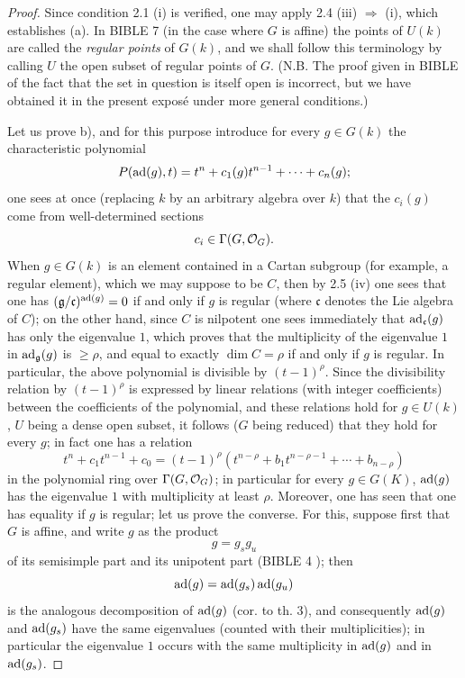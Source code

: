\begin{proof}
Since condition 2.1 (i) is verified, one may apply 2.4 (iii)
$\Rightarrow$ (i), which establishes (a). In BIBLE 7 (in the case where
$G$ is affine) the points of $U(k)$ are called the \emph{regular points}
of $G(k)$, and we shall follow this terminology by calling $U$ the open
subset of regular points of $G$. (N.B. The proof given in BIBLE of the
fact that the set in question is itself open is incorrect, but we have
obtained it in the present expos\'e under more general conditions.)

Let us prove b), and for this purpose introduce for every $g\in G(k)$
the characteristic polynomial
\[
 P(\operatorname{ad}(g),t)=t^n+c_1(g)t^{n-1}+\cdots+c_n(g);
\]
one sees at once (replacing $k$ by an arbitrary algebra over $k$) that
the $c_i(g)$ come from well-determined sections
\[
 c_i\in\Gamma(G,\mathcal{O}_G).
\]
When $g\in G(k)$ is an element contained in a Cartan subgroup (for
example, a regular element), which we may suppose to be $C$, then by
2.5 (iv) one sees that one has $(\mathfrak g/\mathfrak c)^{\operatorname{ad}(g)}=0$
if and only if $g$ is regular (where $\mathfrak c$ denotes the Lie
algebra of $C$); on the other hand, since $C$ is nilpotent one sees
immediately that $\operatorname{ad}_{\mathfrak c}(g)$ has only the eigenvalue $1$,
which proves that the multiplicity of the eigenvalue $1$ in
$\operatorname{ad}_{\mathfrak g}(g)$ is $\geq\rho$, and equal to exactly $\dim C=\rho$
if and only if $g$ is regular. In particular, the above polynomial
is divisible by $(t-1)^\rho$. Since the divisibility relation by
$(t-1)^\rho$ is expressed by linear relations (with integer coefficients)
between the coefficients of the polynomial, and these relations hold
for $g\in U(k)$, $U$ being a dense open subset, it follows ($G$ being
reduced) that they hold for every $g$; in fact one has a relation
\[
 t^n+c_1t^{n-1}+c_0=(t-1)^\rho
 (t^{n-\rho}+b_1t^{n-\rho-1}+\cdots+b_{n-\rho})\tag{$\dagger$}
\]
in the polynomial ring over $\Gamma(G,\mathcal{O}_G)$; in particular for every
$g\in G(K)$, $\operatorname{ad}(g)$ has the eigenvalue $1$ with multiplicity at least
$\rho$. Moreover, one has seen that one has equality if $g$ is regular;
let us prove the converse. For this, suppose first that $G$ is affine,
and write $g$ as the product
\[
 g=g_sg_u
\]
of its semisimple part and its unipotent part (BIBLE 4 ); then
\[
 \operatorname{ad}(g)=\operatorname{ad}(g_s)\operatorname{ad}(g_u)
\]
is the analogous decomposition of $\operatorname{ad}(g)$ (\loccit cor. to th. 3), and
consequently $\operatorname{ad}(g)$ and $\operatorname{ad}(g_s)$ have the same eigenvalues (counted
with their multiplicities); in particular the eigenvalue $1$ occurs
with the same multiplicity in $\operatorname{ad}(g)$ and in $\operatorname{ad}(g_s)$.


\end{proof}
